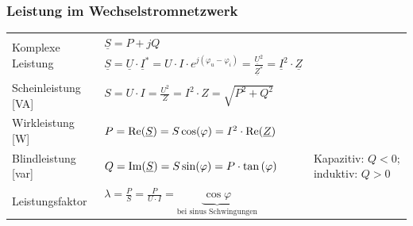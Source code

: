 		\subsubsection{Leistung im Wechselstromnetzwerk}%
				\begin{tabular}{p{4cm}p{7cm}p{7cm}}
					\multirow{2}{4cm}{Komplexe Leistung}  &
						$ \underline{S} = P + jQ$  &\\
						& $ \underline{S} = \underline{U} \cdot \underline{I}^\ast = U\cdot I \cdot e^{j(\varphi_u-\varphi_i)} = \frac{\underline{U}^2}{\underline{Z}^*} = \underline{I}^2 \cdot \underline{Z}$ &
						\\
					Scheinleistung [VA]	& $ S = U\cdot I = \frac{U^2}{Z} 
						= I^2 \cdot Z = \sqrt{P^2+Q^2}$& \\
					Wirkleistung [W] &
						$ P = \operatorname{Re}(\underline{S}) = S \cos(\varphi) = I^2 \cdot \operatorname{Re}(\underline{Z}) $ \\
					Blindleistung [var] &
						$ Q = \operatorname{Im}(\underline{S}) = S \sin(\varphi)  = P \cdot
						\tan\left(\varphi\right)$ & Kapazitiv: $Q < 0$; induktiv: $Q > 0$ \\
					Leistungsfaktor &
						$\lambda = \frac{P}{S} = \frac{P}{U\cdot I} = \underbrace{\cos \varphi}_{\text{bei sinus Schwingungen}}$ \\
				\end{tabular}
		\renewcommand{\arraystretch}{1}
